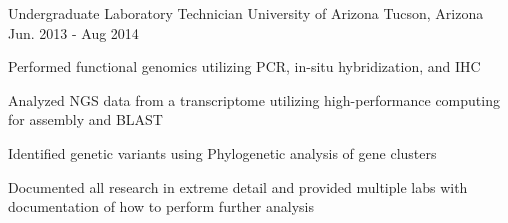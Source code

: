 \begin{cventries}
  \cventry
    {Undergraduate Laboratory Technician} %
    {University of Arizona} %
    {Tucson, Arizona} %
    {Jun. 2013 - Aug 2014} %
    {
      \begin{cvitems} %
        \item{Performed functional genomics utilizing PCR, in-situ hybridization, and IHC}
        \item{Analyzed NGS data from a transcriptome utilizing high-performance computing for assembly and BLAST}
        \item{Identified genetic variants using Phylogenetic analysis of gene clusters}
        \item{Documented all research in extreme detail and provided multiple labs with documentation of how to perform further analysis}
      \end{cvitems}
    }
\end{cventries}
